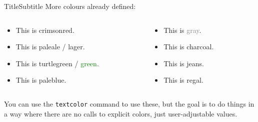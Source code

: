 \begin{frame}[c]{Title}{Subtitle}
More colours already defined:
		\begin{columns}[t]
		\begin{column}[T]{5.5cm}
			\begin{itemize}
			\item This is \textcolor{crimsonred}{crimsonred}.
			\item This is \textcolor{paleale}{paleale} / \textcolor{lager}{lager}.
			\item This is \textcolor{turtlegreen}{turtlegreen} / \textcolor{green}{green}.
			\item This is \textcolor{paleblue}{paleblue}.
			\end{itemize}
		\end{column}

		\begin{column}[T]{5.5cm}
			\begin{itemize}
			\item This is \textcolor{gray}{gray}.
			\item This is \textcolor{charcoal}{charcoal}.
			\item This is \textcolor{jeans}{jeans}.
			\item This is \textcolor{regal}{regal}.
			\end{itemize}
		\end{column}
		\end{columns}
		\vspace{1em}

You can use the \alert{\texttt{textcolor}} command to use these, but the goal is to do things in a way where there are no calls to explicit colors, just user-adjustable values.
\end{frame}



